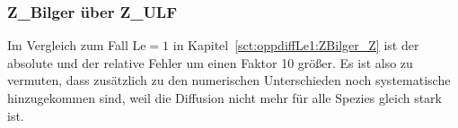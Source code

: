 %

\subsubsection{\texorpdfstring{\gls{Z_Bilger}}{ZBilger} über \texorpdfstring{\gls{Z_ULF}}{ZULF}}

Im Vergleich zum Fall $\mathrm{Le}=1$ in Kapitel~\ref{sct:oppdiffLe1:ZBilger_Z} ist der absolute und der relative Fehler um einen Faktor 10 größer. Es ist also zu vermuten, dass zusätzlich zu den numerischen Unterschieden noch systematische hinzugekommen sind, weil die Diffusion nicht mehr für alle Spezies gleich stark ist.


